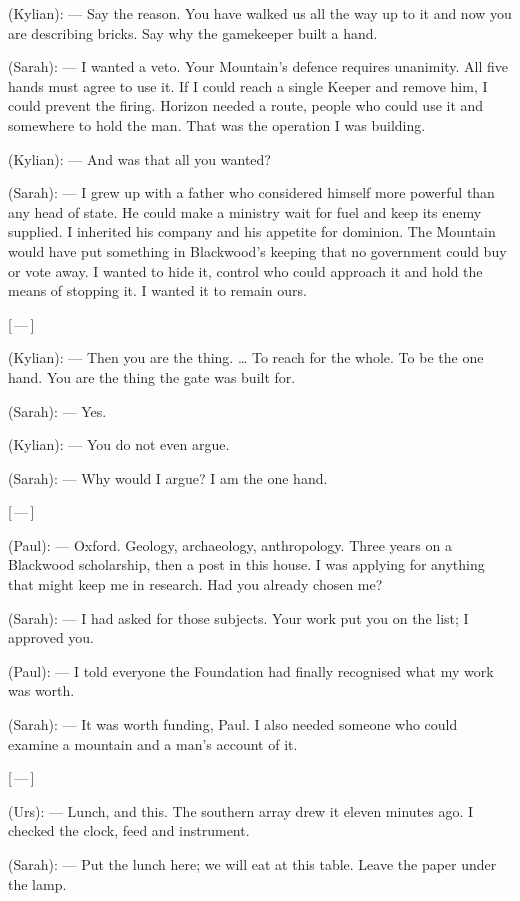 \begin{room}

(Kylian): --- Say the reason. You have walked us all the way up to it and now you are describing bricks. Say why the gamekeeper built a hand.

(Sarah): --- I wanted a veto. Your Mountain's defence requires unanimity. All five hands must agree to use it. If I could reach a single Keeper and remove him, I could prevent the firing. Horizon needed a route, people who could use it and somewhere to hold the man. That was the operation I was building.

(Kylian): --- And was that all you wanted?

(Sarah): --- I grew up with a father who considered himself more powerful than any head of state. He could make a ministry wait for fuel and keep its enemy supplied. I inherited his company and his appetite for dominion. The Mountain would have put something in Blackwood's keeping that no government could buy or vote away. I wanted to hide it, control who could approach it and hold the means of stopping it. I wanted it to remain ours.

\centerline{[\,---\,]}

(Kylian): --- Then you are the thing. \ldots{} To reach for the whole. To be the one hand. You are the thing the gate was built for.

(Sarah): --- Yes.

(Kylian): --- You do not even argue.

(Sarah): --- Why would I argue? I am the one hand.

\centerline{[\,---\,]}

(Paul): --- Oxford. Geology, archaeology, anthropology. Three years on a Blackwood scholarship, then a post in this house. I was applying for anything that might keep me in research. Had you already chosen me?

(Sarah): --- I had asked for those subjects. Your work put you on the list; I approved you.

(Paul): --- I told everyone the Foundation had finally recognised what my work was worth.

(Sarah): --- It was worth funding, Paul. I also needed someone who could examine a mountain and a man's account of it.

\centerline{[\,---\,]}
(Urs): --- Lunch, and this. The southern array drew it eleven minutes ago. I checked the clock, feed and instrument.

(Sarah): --- Put the lunch here; we will eat at this table. Leave the paper under the lamp.


\end{room}
